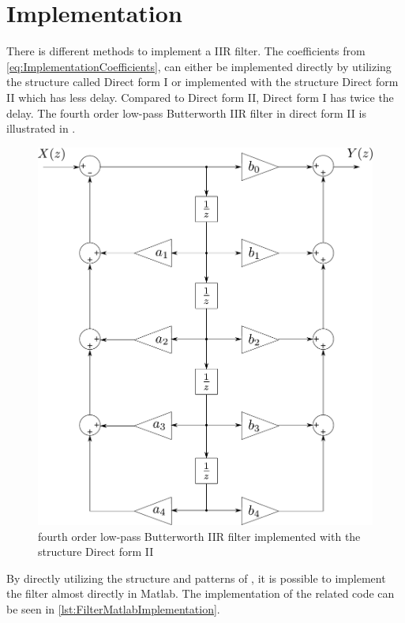 \section{Implementation}
There is different methods to implement a IIR filter. The coefficients from \eqref{eq:ImplementationCoefficients}, can either be implemented directly by utilizing the structure called Direct form I or implemented with the structure Direct form II which has less delay. Compared to Direct form II, Direct form I has twice the delay. The fourth order low-pass Butterworth IIR filter in direct form II is illustrated in .
%
\begin{figure}[H]
	\centering
	\includegraphics[scale=0.5]{figures/IIRfilter.pdf}
	\caption{fourth order low-pass Butterworth IIR filter implemented with the structure Direct form II}
	\label{fig:IIRfilter}
\end{figure}
%
By directly utilizing the structure and patterns of , it is possible to implement the filter almost directly in Matlab. The implementation of the related code can be seen in \autoref{lst:FilterMatlabImplementation}.
%
